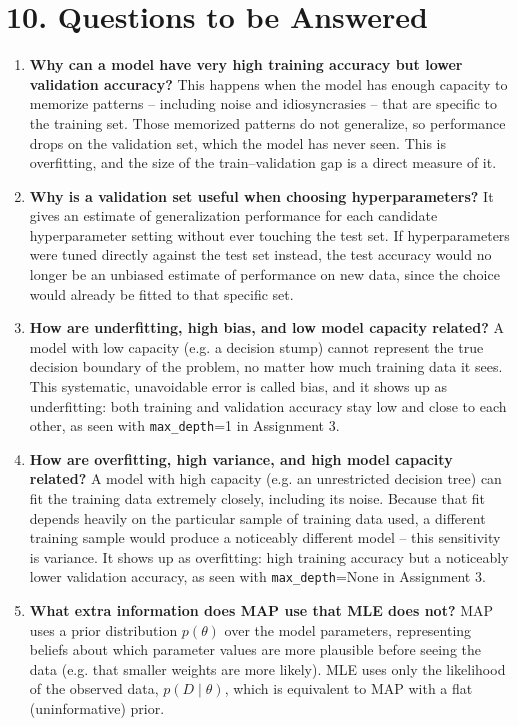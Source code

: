 \documentclass[12pt,a4paper]{article}
\begin{document}
\section*{10. Questions to be Answered}

\begin{enumerate}
\item \textbf{Why can a model have very high training accuracy but lower validation accuracy?} This happens when the model has enough capacity to memorize patterns -- including noise and idiosyncrasies -- that are specific to the training set. Those memorized patterns do not generalize, so performance drops on the validation set, which the model has never seen. This is overfitting, and the size of the train--validation gap is a direct measure of it.

\item \textbf{Why is a validation set useful when choosing hyperparameters?} It gives an estimate of generalization performance for each candidate hyperparameter setting without ever touching the test set. If hyperparameters were tuned directly against the test set instead, the test accuracy would no longer be an unbiased estimate of performance on new data, since the choice would already be fitted to that specific set.

\item \textbf{How are underfitting, high bias, and low model capacity related?} A model with low capacity (e.g. a decision stump) cannot represent the true decision boundary of the problem, no matter how much training data it sees. This systematic, unavoidable error is called bias, and it shows up as underfitting: both training and validation accuracy stay low and close to each other, as seen with \texttt{max\_depth}=1 in Assignment 3.

\item \textbf{How are overfitting, high variance, and high model capacity related?} A model with high capacity (e.g. an unrestricted decision tree) can fit the training data extremely closely, including its noise. Because that fit depends heavily on the particular sample of training data used, a different training sample would produce a noticeably different model -- this sensitivity is variance. It shows up as overfitting: high training accuracy but a noticeably lower validation accuracy, as seen with \texttt{max\_depth}=None in Assignment 3.

\item \textbf{What extra information does MAP use that MLE does not?} MAP uses a prior distribution $p(\theta)$ over the model parameters, representing beliefs about which parameter values are more plausible before seeing the data (e.g. that smaller weights are more likely). MLE uses only the likelihood of the observed data, $p(D\mid\theta)$, which is equivalent to MAP with a flat (uninformative) prior.


\end{enumerate}
\end{document}
